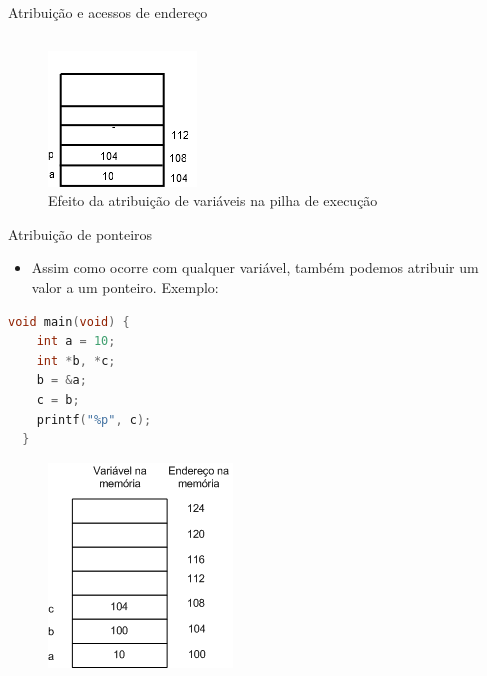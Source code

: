 \begin{frame}[plain,c]{Atribuição e acessos de endereço}
\begin{columns}
    \end{columns}
    \begin{figure}[ht]
          \centering
          \includegraphics[width=.4\textwidth]{figs/fig_ponteiros/memoria-atribuicao-pa}
          \caption{Efeito da atribuição de variáveis na pilha de execução}
    \end{figure}
\end{frame}

\begin{frame}{Atribuição de ponteiros}
  \begin{itemize}[<+->]
    \item Assim como ocorre com qualquer variável, também podemos atribuir um valor a um ponteiro. Exemplo:
  \end{itemize}
  \begin{minipage}[b]{0.45\linewidth}
  \begin{lstlisting}[language=C]
  void main(void) {
    int a = 10;
    int *b, *c;
    b = &a;
    c = b;
    printf("%p", c);
  }
  \end{lstlisting}
  \end{minipage}
  \hspace{0.1cm}
  \begin{minipage}[b]{0.45\linewidth}
      \begin{figure}[!ht]
       \includegraphics[width=.6\columnwidth]{figs/fig_ponteiros/exemplo-atribuicao-ponteiro}
      \end{figure}
    \end{minipage}  
\end{frame}


